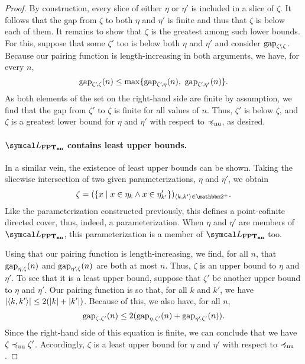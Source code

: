 \begin{proof}
  By construction, every slice of either $\eta$ or $\eta'$ is included in a slice of $\zeta$.
  It follows that the gap from $\zeta$ to both $\eta$ and $\eta'$ is finite and thus that $\zeta$ is below each of them.
  It remains to show that $\zeta$ is the greatest among such lower bounds.
  For this, suppose that some $\zeta'$ too is below both $\eta$ and $\eta'$ and consider $\operatorname{gap}_{\zeta'\!, \zeta}$.
  Because our pairing function is length-increasing in both arguments, we have, for every $n$,
  \begin{equation*}
    \operatorname{gap}_{\zeta'\!, \zeta}(n) \le \max\{\operatorname{gap}_{\zeta'\!, \eta}(n),\ \operatorname{gap}_{\zeta'\!, \eta'}(n)\}.
  \end{equation*}
  As both elements of the set on the right-hand side are finite by assumption, we find that the gap from $\zeta'$ to $\zeta$ is finite for all values of $n$.
  Thus, $\zeta'$ is below $\zeta$, and $\zeta$ is a greatest lower bound for $\eta$ and $\eta'$ with respect to $\preccurlyeq_\mathrm{nu}$, as desired.

  \paragraph{$\calL_\clnu{FPT}$ contains least upper bounds.}
  In a similar vein, the existence of least upper bounds can be shown.
  Taking the slicewise intersection of two given parameterizations, $\eta$ and $\eta'$, we obtain
  \begin{equation*}
    \zeta \deq (\{x \st x \in \eta_k \land x \in \eta'_{k'}\})_{\pair{k}{k'} \in \binary^+}.
  \end{equation*}
  Like the parameterization constructed previously, this defines a point-cofinite directed cover, thus, indeed, a parameterization.
  When $\eta$ and $\eta'$ are members of $\calL_\clnu{FPT}$, this parameterization is a member of $\calL_\clnu{FPT}$ too.

  Using that our pairing function is length-increasing, we find, for all $n$, that $\operatorname{gap}_{\eta, \zeta}(n)$ and $\operatorname{gap}_{\eta'\!, \zeta}(n)$ are both at most $n$.
  Thus, $\zeta$ is an upper bound to $\eta$ and $\eta'$.
  To see that it is a least upper bound, suppose that $\zeta'$ be another upper bound to $\eta$ and $\eta'$.
  Our pairing function is so that, for all $k$ and $k'$, we have ${\lvert{\langle k, k'\rangle}\rvert} \le 2({\lvert k\rvert} + {\lvert k'\rvert})$.
  Because of this, we also have, for all $n$,
  \begin{equation*}
    \operatorname{gap}_{\zeta, \zeta'}(n) \le 2(\operatorname{gap}_{\eta, \zeta'}(n) + \operatorname{gap}_{\eta'\!, \zeta'}(n)).
  \end{equation*}
  Since the right-hand side of this equation is finite, we can conclude that we have $\zeta \preccurlyeq_\mathrm{nu} \zeta'$.
  Accordingly, $\zeta$ is a least upper bound for $\eta$ and $\eta'$ with respect to $\preccurlyeq_\mathrm{nu}$.


\end{proof}
